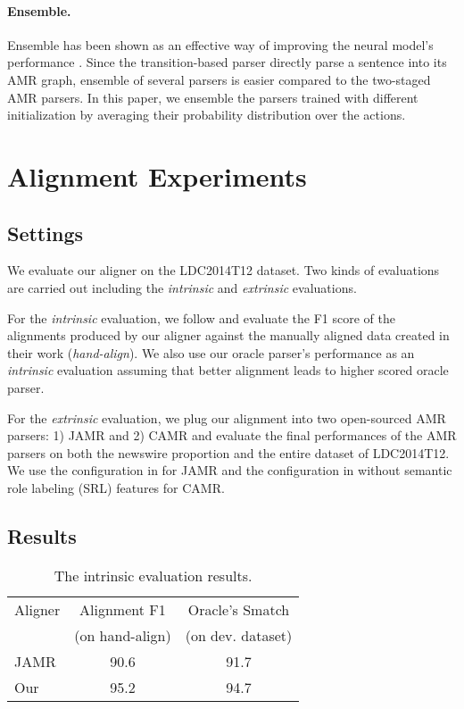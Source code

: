 \documentclass[11pt,a4paper]{article}
\begin{document}
\paragraph{Ensemble.}
Ensemble has been shown as an effective way of improving the neural model's performance \cite{he-EtAl:2017:Long3}.
Since the transition-based parser directly parse a sentence into its AMR graph,
ensemble of several parsers is easier compared to the two-staged AMR parsers.
In this paper, we ensemble the parsers trained with different initialization
by averaging their probability distribution over the actions.

\section{Alignment Experiments}\label{sec:align-exp}

\subsection{Settings}

We evaluate our aligner on the LDC2014T12 dataset.
Two kinds of evaluations are carried out including the {\it intrinsic} and {\it extrinsic} evaluations.

For the {\it intrinsic} evaluation, we follow \citet{flanigan-EtAl:2014:P14-1}
and evaluate the F1 score of the alignments produced by our aligner
against the manually aligned data created in their work
({\it hand-align}).
We also use our oracle parser's performance as an {\it intrinsic} evaluation
assuming that better alignment leads to higher scored oracle parser.

For the {\it extrinsic} evaluation, we plug our alignment into two open-sourced AMR parsers: 1) JAMR \citep{flanigan-EtAl:2014:P14-1,flanigan-EtAl:2016:SemEval}
and 2) CAMR \cite{wang-xue-pradhan:2015:NAACL-HLT,wang-xue-pradhan:2015:ACL-IJCNLP} and evaluate the final performances of the AMR parsers
on both the newswire proportion and the entire dataset of LDC2014T12.
We use the configuration in \citet{flanigan-EtAl:2016:SemEval} for JAMR 
and the configuration in \citet{wang-xue-pradhan:2015:ACL-IJCNLP} without 
semantic role labeling (SRL) features for CAMR.

\subsection{Results}

\begin{table}[t]
	\centering
	\begin{tabular}{lcc}
		\hline
		Aligner & Alignment F1 & Oracle's Smatch\\
		& (on hand-align) & (on dev. dataset)\\
		\hline
		JAMR & 90.6 & 91.7 \\
		Our & 95.2 & 94.7 \\
		\hline
	\end{tabular}
	\caption{The intrinsic evaluation results.}\label{tbl:int-eval}
\end{table}
\end{document}
